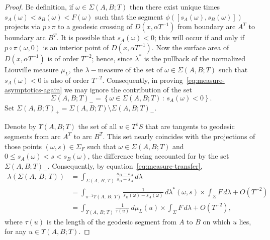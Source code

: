 \documentclass[AHL, Unicode, longabstracts, published]{cedram}
\newcommand{\xset}[1]{\left\{ #1 \right\}}
\begin{document}
\begin{proof}
Be definition, if $\omega \in \Sigma(A,B;T)$ then there exist unique times\linebreak$s_{A}(\omega) <s_{B}(\omega)<F(\omega)$ such that the segment $\phi ([s_{A}(\omega),s_{B}(\omega)])$ projects via $p\circ\pi$ to a geodesic crossing of $D(x,\alpha T^{-1})$ from boundary arc $A^{T}$ to boundary arc $B^{T}$. It is possible that $s_{A}(\omega)<0$; this will occur if and only if $p\circ\pi (\omega,0)$ is an interior point of $D(x, \alpha T^{-1})$. Now the surface area of $D(x,\alpha T^{-1})$ is of order $T^{-2}$; hence, since $\lambda^{*}$ is the pullback of the normalized Liouville measure $\mu_{L}$, the $\lambda-$measure of the set of $\omega \in \Sigma(A,B;T)$ such that $s_{A}(\omega)<0$ is also of order $T^{-2}$. Consequently, in proving~\eqref{eq:measure-asymptotics-again} we may ignore the contribution of the set
\[
\Sigma(A,B;T)_{-}=\xset {\omega \in \Sigma(A,B;T)\,:\, s_{A}(\omega)<0}.
\]
Set $\Sigma(A,B;T)_{+}=\Sigma(A,B;T)\setminus \Sigma(A,B;T)_{-}$.



Denote by $\Upsilon (A,B;T)$ the set of all $u\in T^1S$ that are tangents to geodesic segments from arc $A^{T}$ to arc $B^{T}$. This set nearly coincides with the projections of those points $(\omega,s)\in \Sigma_{F}$ such that $\omega \in \Sigma (A,B;T)$ and $0\leq s_{A} (\omega)<s<s_{B} (\omega)$, the difference being accounted for by the set $\Sigma(A,B;T)_{-}$. Consequently, by equation~\eqref{eq:measure-transfer},
\begin{align*}
\lambda (\Sigma (A,\,B;\,T))&= \int_{\Sigma (A,\,B;\,T)}\frac{s_{B}-s_{A}}{s_{B}-s_{A}} \,d\lambda \\
&=\int_{\pi^{-1}\Upsilon (A,\,B;\,T)} \frac{1}{s_{B} (\omega)-s_{A}(\omega)} \,d\lambda^{*} (\omega,s) \times \int_{\Sigma}F\,d\lambda +O\left(T^{-2}\right)\\
&=\int_{\Upsilon (A,\,B;\,T)} \frac{1}{\tau (u)} \,d\mu_{L} (u) \times\int_{\Sigma}F\,d\lambda +O\left(T^{-2}\right),
\end{align*}
where $\tau(u)$ is the length of the geodesic segment from $A$ to $B$ on which $u$ lies, for any $u\in \Upsilon (A,B;T)$.


\end{proof}
\end{document}
